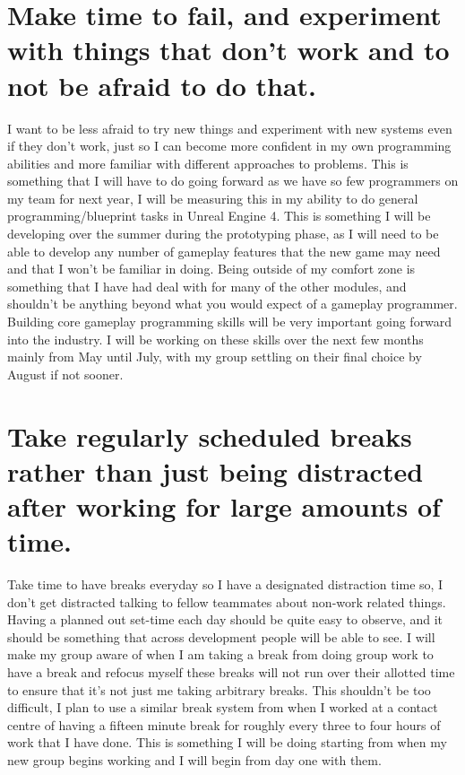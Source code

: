 \documentclass{scrartcl}
\begin{document}
\section{Make time to fail, and experiment with things that don't work and to not be afraid to do that.}

I want to be less afraid to try new things and experiment with new systems even if they don't work, just so I can become more confident in my own programming abilities and more familiar with different approaches to problems. This is something that I will have to do going forward as we have so few programmers on my team for next year, I will be measuring this in my ability to do general programming/blueprint tasks in Unreal Engine 4. This is something I will be developing over the summer during the prototyping phase, as I will need to be able to develop any number of gameplay features that the new game may need and that I won't be familiar in doing. Being outside of my comfort zone is something that I have had deal with for many of the other modules, and shouldn't be anything beyond what you would expect of a gameplay programmer. Building core gameplay programming skills will be very important going forward into the industry. I will be working on these skills over the next few months mainly from May until July, with my group settling on their final choice by August if not sooner.

\section{Take regularly scheduled breaks rather than just being distracted after working for large amounts of time.}

Take time to have breaks everyday so I have a designated distraction time so, I don't get distracted talking to fellow teammates about non-work related things. Having a planned out set-time each day should be quite easy to observe, and it should be something that across development people will be able to see. I will make my group aware of when I am taking a break from doing group work to have a break and refocus myself these breaks will not run over their allotted time to ensure that it's not just me taking arbitrary breaks. This shouldn't be too difficult, I plan to use a similar break system from when I worked at a contact centre of having a fifteen minute break for roughly every three to four hours of work that I have done. This is something I will be doing starting from when my new group begins working and I will begin from day one with them.
\end{document}
